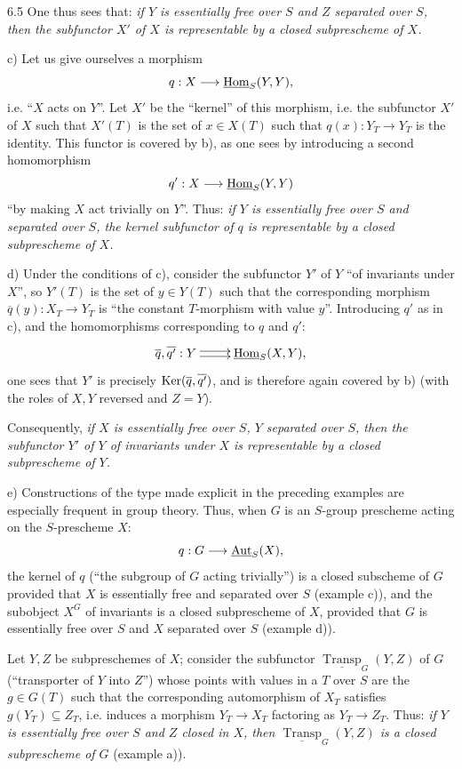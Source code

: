 \begin{examples}{6.5}
One thus sees that: \emph{if $Y$ is essentially free over $S$ and $Z$ separated over $S$, then the subfunctor $X'$ of $X$ is representable by a closed subprescheme of $X$.}

c) Let us give ourselves a morphism
\[
q:X\longrightarrow\underline{\operatorname{Hom}}_S(Y,Y),
\]
i.e. ``$X$ acts on $Y$''. Let $X'$ be the ``kernel'' of this morphism, i.e. the subfunctor $X'$ of $X$ such that $X'(T)$ is the set of $x\in X(T)$ such that $q(x):Y_T\to Y_T$ is the identity. This functor is covered by b), as one sees by introducing a second homomorphism
\[
q':X\longrightarrow\underline{\operatorname{Hom}}_S(Y,Y)
\]
``by making $X$ act trivially on $Y$''. Thus: \emph{if $Y$ is essentially free over $S$ and separated over $S$, the kernel subfunctor of $q$ is representable by a closed subprescheme of $X$.}

d) Under the conditions of c), consider the subfunctor $Y'$ of $Y$ ``of invariants under $X$'', so $Y'(T)$ is the set of $y\in Y(T)$ such that the corresponding morphism $\overline q(y):X_T\to Y_T$ is ``the constant $T$-morphism with value $y$''. Introducing $q'$ as in c), and the homomorphisms corresponding to $q$ and $q'$:
\[
\xymatrix{\overline q,\overline{q'}:Y\ar@<.5ex>[r]\ar@<-.5ex>[r]&\uHom_S(X,Y),}
\]
one sees that $Y'$ is precisely $\operatorname{Ker}(\overline q,\overline{q'})$, and is therefore again covered by b) (with the roles of $X,Y$ reversed and $Z=Y$).

Consequently, \emph{if $X$ is essentially free over $S$, $Y$ separated over $S$, then the subfunctor $Y'$ of $Y$ of invariants under $X$ is representable by a closed subprescheme of $Y$.}

e) Constructions of the type made explicit in the preceding examples are especially frequent in group theory. Thus, when $G$ is an $S$-group prescheme acting on the $S$-prescheme $X$:
\[
q:G\longrightarrow\underline{\operatorname{Aut}}_S(X),
\]
the kernel of $q$ (``the subgroup of $G$ acting trivially'') is a closed subscheme of $G$ provided that $X$ is essentially free and separated over $S$ (example c)), and the subobject $X^G$ of invariants is a closed subprescheme of $X$, provided that $G$ is essentially free over $S$ and $X$ separated over $S$ (example d)).

Let $Y,Z$ be subpreschemes of $X$; consider the subfunctor $\underline{\operatorname{Transp}}_G(Y,Z)$ of $G$ (``transporter of $Y$ into $Z$'') whose points with values in a $T$ over $S$ are the $g\in G(T)$ such that the corresponding automorphism of $X_T$ satisfies $g(Y_T)\subseteq Z_T$, i.e. induces a morphism $Y_T\to X_T$ factoring as $Y_T\to Z_T$. Thus: \emph{if $Y$ is essentially free over $S$ and $Z$ closed in $X$, then $\underline{\operatorname{Transp}}_G(Y,Z)$ is a closed subprescheme of $G$} (example a)).


\end{examples}
